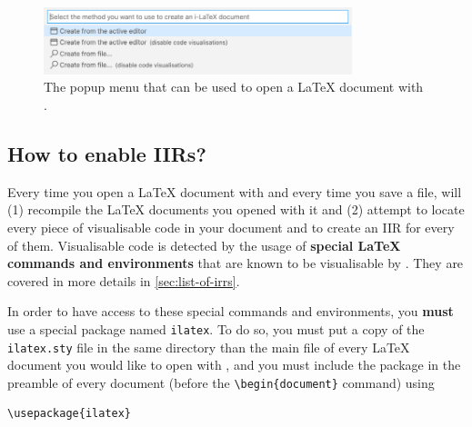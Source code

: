 \documentclass[11pt, a4paper]{article}
\begin{document}
\begin{figure}[h]
    \centering
    \includegraphics[width = 0.8\textwidth]{img/ilatex-menu.png}
    \caption{The popup menu that can be used to open a \LaTeX{} document with \iLaTeX{}.}
    \label{fig:open-with-ilatex-menu}
\end{figure}

\subsection{How to enable IIRs?}
\label{ssec:how-to-enable-iirs}
Every time you open a \LaTeX{} document with \iLaTeX{} and every time you save a file, \iLaTeX{} will (1) recompile the \LaTeX{} documents you opened with it and (2) attempt to locate every piece of visualisable code in your document and to create an IIR for every of them.
Visualisable code is detected by the usage of \textbf{special \LaTeX{} commands and environments} that are known to be visualisable by \iLaTeX{}.
They are covered in more details in \autoref{sec:list-of-irrs}.

In order to have access to these special commands and environments, you \textbf{must} use a special package named \texttt{ilatex}.
To do so, you must put a copy of the \texttt{ilatex.sty} file in the same directory than the main file of every \LaTeX{} document you would like to open with \iLaTeX{}, and you must include the package in the preamble of every document (\ie before the \verb|\begin{document}| command) using

\begin{lstlisting}[style=custom-latex]
\usepackage{ilatex}
\end{lstlisting}
\end{document}
